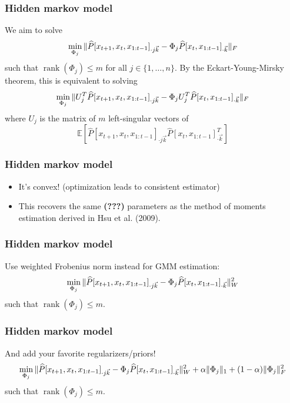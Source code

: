 \documentclass[10pt, compress]{beamer}
\begin{document}
\begin{frame}
  \frametitle{Hidden markov model}

  We aim to solve
  \begin{equation*}
  \operatornamewithlimits{min}_{\Phi_{j}}
  \|\widehat P[x_{t+1}, x_t, x_{1:t-1}]_{\cdot j\vec{k}} - \Phi_j \widehat P[x_t, x_{1:t-1}]_{\cdot \vec{k}}\|_F
  \end{equation*}
  such that $\operatorname{rank}(\Phi_j)\le m$ for all $j\in\{1,\ldots,n\}$.
  By the Eckart-Young-Mirsky theorem, this is equivalent to solving
  \begin{equation*}
  \operatornamewithlimits{min}_{\Phi_{j}}
  \|U_j^T\widehat P[x_{t+1}, x_t, x_{1:t-1}]_{\cdot j\vec{k}} - \Phi_j U_j^T \widehat P[x_t, x_{1:t-1}]_{\cdot \vec{k}}\|_F
  \end{equation*}
  where $U_j$ is the matrix of $m$ left-singular vectors of
  \begin{equation*}
  \mathbb{E}[\widehat P[x_{t+1}, x_t, x_{1:t-1}]_{\cdot j\vec{k}}\widehat P[x_t, x_{1:t-1}]_{\cdot \vec{k}}^T]
  \end{equation*}

\end{frame}

\begin{frame}
  \frametitle{Hidden markov model}

  \begin{itemize}
  \item It's convex! (optimization leads to consistent estimator)
  \item This recovers the same \textbf{(???)} parameters as the method of moments estimation derived in \alert{Hsu et al. (2009)}.
  \end{itemize}

\end{frame}

\begin{frame}
  \frametitle{Hidden markov model}

  Use weighted Frobenius norm instead for GMM estimation:
  \begin{equation*}
  \operatornamewithlimits{min}_{\Phi_{j}}
  \|\widehat P[x_{t+1}, x_t, x_{1:t-1}]_{\cdot j\vec{k}} - \Phi_j \widehat P[x_t, x_{1:t-1}]_{\cdot \vec{k}}\|_W^2
  \end{equation*}
  such that $\operatorname{rank}(\Phi_j)\le m$.

\end{frame}

\begin{frame}
  \frametitle{Hidden markov model}

  And add your favorite regularizers/priors!
  \begin{equation*}
  \operatornamewithlimits{min}_{\Phi_{j}}
  \|\widehat P[x_{t+1}, x_t, x_{1:t-1}]_{\cdot j\vec{k}} - \Phi_j \widehat P[x_t, x_{1:t-1}]_{\cdot \vec{k}}\|_W^2 + \alpha\|\Phi_j\|_1 + (1-\alpha)\|\Phi_j\|_F^2
  \end{equation*}
  such that $\operatorname{rank}(\Phi_j)\le m$.
\end{frame}
\end{document}
